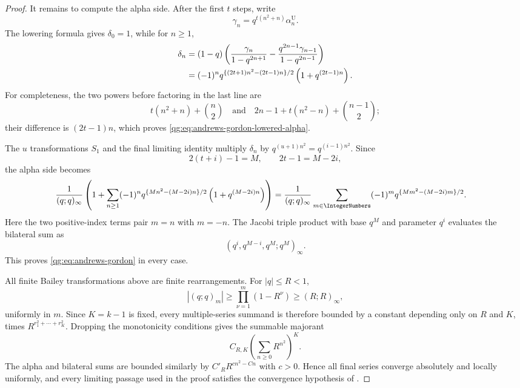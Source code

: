 \begin{proof}
It remains to compute the alpha side.  After the first \(t\) steps, write
\[
 \gamma_n=q^{t(n^2+n)}\alpha_n^{\mathrm U}.
\]
The lowering formula gives \(\delta_0=1\), while for \(n\ge1\),
\begin{align}
 \delta_n
 &=(1-q)\left(
   \frac{\gamma_n}{1-q^{2n+1}}
   -\frac{q^{2n-1}\gamma_{n-1}}{1-q^{2n-1}}
   \right)\notag\\
 &=(-1)^n
 q^{\{(2t+1)n^2-(2t-1)n\}/2}
 \left(1+q^{(2t-1)n}\right).
 \label{qg:eq:andrews-gordon-lowered-alpha}
\end{align}
For completeness, the two powers before factoring in the last line are
\[
 t(n^2+n)+\binom n2
 \quad\text{and}\quad
 2n-1+t(n^2-n)+\binom{n-1}{2};
\]
their difference is \((2t-1)n\), which proves
\eqref{qg:eq:andrews-gordon-lowered-alpha}.

The \(u\) transformations \(S_1\) and the final limiting identity
multiply \(\delta_n\) by \(q^{(u+1)n^2}=q^{(i-1)n^2}\).
Since
\[
  2(t+i)-1=M,\qquad 2t-1=M-2i,
\]
the alpha side becomes
\begin{align*}
 \frac1{(q;q)_\infty}
 \left(
 1+\sum_{n\ge1}(-1)^n
 q^{\{Mn^2-(M-2i)n\}/2}
 \left(1+q^{(M-2i)n}\right)
 \right)
 &=
 \frac1{(q;q)_\infty}
 \sum_{m\in\IntegerNumbers}(-1)^m
 q^{\{Mm^2-(M-2i)m\}/2}.
\end{align*}
Here the two positive-index terms pair \(m=n\) with \(m=-n\).
The Jacobi triple product with base \(q^M\) and parameter \(q^i\)
evaluates the bilateral sum as
\[
  (q^i,q^{M-i},q^M;q^M)_\infty.
\]
This proves \eqref{qg:eq:andrews-gordon} in every case.

All finite Bailey transformations above are finite rearrangements.  For
\(|q|\le R<1\),
\[
  |(q;q)_m|
  \ge\prod_{\nu=1}^{m}(1-R^\nu)
  \ge(R;R)_\infty,
\]
uniformly in \(m\).  Since \(K=k-1\) is fixed, every multiple-series
summand is therefore bounded by a constant depending only on \(R\) and
\(K\), times \(R^{r_1^2+\cdots+r_K^2}\).  Dropping the monotonicity
conditions gives the summable majorant
\[
  C_{R,K}\left(\sum_{n\ge0}R^{n^2}\right)^K.
\]
The alpha and bilateral sums are bounded similarly by
\(C'_R R^{c n^2-Cn}\) with \(c>0\).  Hence all final series converge
absolutely and locally uniformly, and every limiting passage used in the
proof satisfies the convergence hypothesis of
.
\end{proof}

